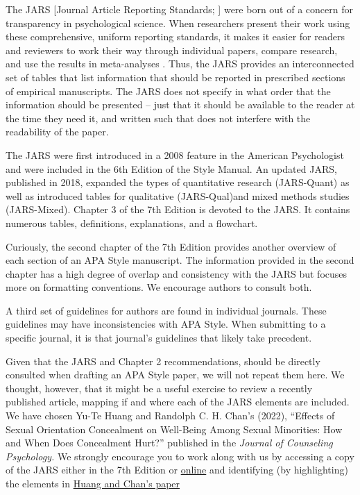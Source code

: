 \documentclass[
  11pt,
]{book}
\begin{document}
The JARS {[}Journal Article Reporting Standards; \citet{appelbaum_journal_2018}{]} were born out of a concern for transparency in psychological science. When researchers present their work using these comprehensive, uniform reporting standards, it makes it easier for readers and reviewers to work their way through individual papers, compare research, and use the results in meta-analyses \citep{american_psychological_association_publication_2020}. Thus, the JARS provides an interconnected set of tables that list information that should be reported in prescribed sections of empirical manuscripts. The JARS does not specify in what order that the information should be presented -- just that it should be available to the reader at the time they need it, and written such that does not interfere with the readability of the paper.

The JARS were first introduced in a 2008 feature in the American Psychologist \citep{noauthor_reporting_2008} and were included in the 6th Edition of the Style Manual. An updated JARS, published in 2018, expanded the types of quantitative research (JARS-Quant) as well as introduced tables for qualitative (JARS-Qual)and mixed methods studies (JARS-Mixed). Chapter 3 of the 7th Edition is devoted to the JARS. It contains numerous tables, definitions, explanations, and a flowchart.

Curiously, the second chapter of the 7th Edition provides another overview of each section of an APA Style manuscript. The information provided in the second chapter has a high degree of overlap and consistency with the JARS but focuses more on formatting conventions. We encourage authors to consult both.

A third set of guidelines for authors are found in individual journals. These guidelines may have inconsistencies with APA Style. When submitting to a specific journal, it is that journal's guidelines that likely take precedent.

Given that the JARS and Chapter 2 recommendations, should be directly consulted when drafting an APA Style paper, we will not repeat them here. We thought, however, that it might be a useful exercise to review a recently published article, mapping if and where each of the JARS elements are included. We have chosen Yu-Te Huang and Randolph C. H. Chan's (2022), ``Effects of Sexual Orientation Concealment on Well-Being Among Sexual Minorities: How and When Does Concealment Hurt?'' published in the \emph{Journal of Counseling Psychology.} We strongly encourage you to work along with us by accessing a copy of the JARS either in the 7th Edition or \href{https://apastyle.apa.org/jars/quantitative}{online} and identifying (by highlighting) the elements in \href{https://pubmed.ncbi.nlm.nih.gov/35696152/}{Huang and Chan's paper}
\end{document}

